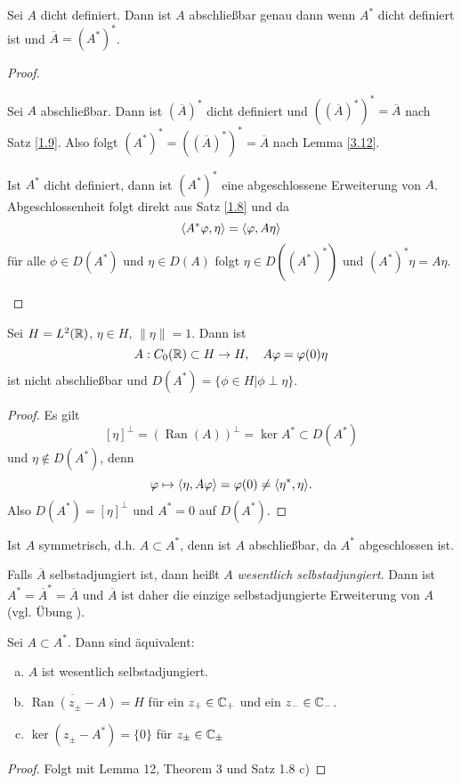 \documentclass{mycourse}
\newcommand{\Ran}{\operatorname{Ran}}
\begin{document}
\begin{st}
Sei $A$ dicht definiert. Dann ist $A$ abschließbar genau dann wenn $A^*$ dicht definiert ist und $\overline{A}=(A^*)^*$.
\end{st}
\begin{proof}
\begin{seg}[$\implies$]
Sei $A$ abschließbar. Dann ist $(\overline{A})^*$ dicht definiert und $((\overline{A})^*)^*=\overline{A}$ nach Satz \ref{1.9}. Also folgt $(A^*)^*=((\overline{A})^*)^*=\overline{A}$ nach Lemma \ref{3.12}.
\end{seg}
\begin{seg}[$\Longleftarrow$]
Ist $A^*$ dicht definiert, dann ist $(A^*)^*$ eine abgeschlossene Erweiterung von $A$. Abgeschlossenheit folgt direkt aus Satz \ref{1.8} und da
\[
\langle A^* \varphi, \eta\rangle = \langle \varphi, A\eta\rangle
\]
für alle $\phi\in D(A^*)$ und $\eta\in D(A)$ folgt $\eta \in D((A^*)^*)$ und $(A^*)^*\eta = A\eta$. 
\end{seg}
\end{proof}
\begin{ex*}
Sei $H= L^2(\mathbb{R})$, $\eta\in H$, $\| \eta \|=1$. Dann ist
\[
A: C_0(\mathbb{R}) \subset H \to H,\quad A\varphi = \varphi(0)\eta
\]
ist nicht abschließbar und $D(A^*)=\{\phi \in H|\phi \perp \eta\}$.
\end{ex*}
\begin{proof}
Es gilt
\[
[\eta]^\perp = (\Ran(A))^\perp= \ker A^* \subset D(A^*)
\]
und $\eta\not\in D(A^*)$, denn
\[
\varphi \mapsto \langle \eta, A\varphi\rangle = \varphi(0) \neq \langle \eta^*, \eta\rangle.
\]
Also $D(A^*)=[\eta]^\perp$ und $A^*=0$ auf $D(A^*)$.
\end{proof}
Ist $A$ symmetrisch, d.h. $A\subset A^*$, denn ist $A$ abschließbar, da $A^*$ abgeschlossen ist.

Falls $\overline{A}$ selbstadjungiert ist, dann heißt $A$ \emph{wesentlich selbstadjungiert}. Dann ist
$A^*=\overline{A}^*=\overline{A}$ und $\overline{A}$ ist daher die einzige selbstadjungierte Erweiterung von $A$ (vgl. Übung \fixme[welche?]).

\setcounter{thm}{13}
\begin{st}
Sei $A\subset A^*$. Dann sind äquivalent:
\begin{enumerate}[a)]
\item $A$ ist wesentlich selbstadjungiert.
\item $\overline{\Ran(z_\pm -A)}=H$ für ein $z_+\in \mathbb{C}_+$ und ein $z_-\in \mathbb{C}_-$.
\item $\ker(z_\pm - A^*)= \{0\}$ für $z_\pm \in \mathbb{C}_\pm$
\end{enumerate}
\end{st}
\begin{proof}
Folgt mit Lemma 12, Theorem 3 und Satz 1.8 c)
\end{proof}
\end{document}
